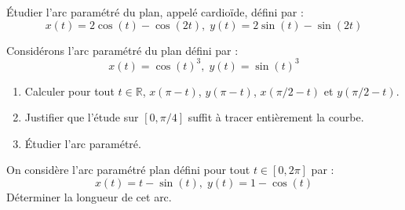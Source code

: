 \documentclass[a4paper,10pt]{report}
\begin{document}
\exo Étudier l'arc paramétré du plan, appelé cardioïde,  défini par :
$$ x(t) = 2 \cos(t) - \cos(2t), \; y(t) = 2 \sin(t) - \sin(2t) $$

\exo Considérons l'arc paramétré du plan défini par :
$$ x(t) =\cos(t)^3, \; y(t) = \sin(t)^3 $$

\begin{enumerate}
\item Calculer pour tout $t \in \mathbb{R}$, $x(\pi-t)$, $y(\pi-t)$, $x(\pi/2-t)$ et $y(\pi/2-t)$.
\item Justifier que l'étude sur $[0,\pi/4]$ suffit à tracer entièrement la courbe.
\item Étudier l'arc paramétré.
\end{enumerate}

\exo On considère l'arc paramétré plan défini pour tout $t \in [0,2\pi]$ par :
$$ x(t) = t - \sin(t), \; y(t) = 1- \cos(t) $$
Déterminer la longueur de cet arc.
\end{document}
